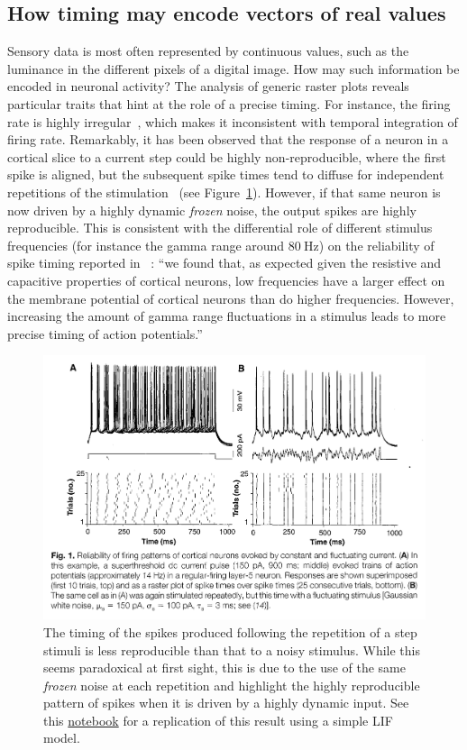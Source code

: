\documentclass[brainsci, %
               review,submit,pdftex,moreauthors%
               ]{Definitions/mdpi}
\begin{document}
\subsection{How timing may encode vectors of real values}
%
Sensory data is most often represented by continuous values, such as the luminance in the different pixels of a digital image. How may such information be encoded in neuronal activity? The analysis of generic raster plots reveals particular traits that hint at the role of a precise timing. For instance, the firing rate is highly irregular~\citep{softky_highly_1993}, which makes it inconsistent with temporal integration of firing rate. %
Remarkably, it has been observed that the response of a neuron in a cortical slice to a current step could be highly non-reproducible, where the first spike is aligned, but the subsequent spike times tend to diffuse for independent repetitions of the stimulation~\citep{mainen_reliability_1995} (see Figure~\ref{fig:mainen}). However, if that same neuron is now driven by a highly dynamic \emph{frozen} noise, the output spikes are highly reproducible. This is consistent with the differential role of different stimulus frequencies (for instance the gamma range around $80~\si{\Hz}$) on the reliability of spike timing reported in~\citep{nowak_influence_1997} : ``we found that, as expected given the resistive and capacitive properties of cortical neurons, low frequencies have a larger effect on the membrane potential of cortical neurons than do higher frequencies. However, increasing the amount of gamma range fluctuations in a stimulus leads to more precise timing of action potentials.'' 
\begin{figure}
\centering
\includegraphics[width=.7\textwidth]{figures/MainenSejnowski1995.png} %
\caption{The timing of the spikes produced following the repetition of a step stimuli is less reproducible than that to a noisy stimulus. While this seems paradoxical at first sight, this is due to the use of the same \emph{frozen} noise at each repetition and highlight the highly reproducible pattern of spikes when it is driven by a highly dynamic input. See this \href{https://github.com/laurentperrinet/2022_UE-neurosciences-computationnelles/blob/master/C_MainenSejnowski1995.ipynb}{notebook} for a replication of this result using a simple LIF model.}\label{fig:mainen}
\end{figure}
\end{document}
